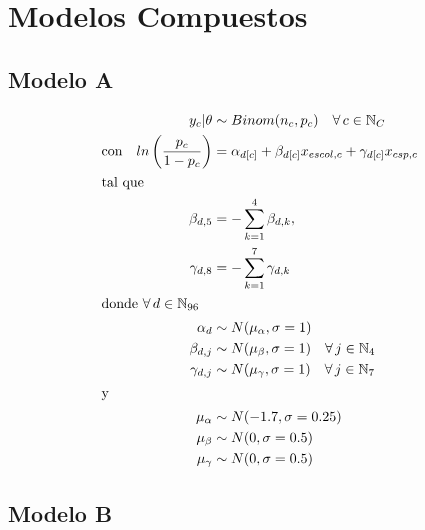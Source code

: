 \chapter{Modelos Compuestos}\label{Anexo_modelos_compuestos}

\section*{Modelo A}

\begin{align}\label{eq:Modelo_Comp_A_Anexo}
y_c|\theta & \sim Binom(n_c,p_c) \quad \forall \, c \in \mathbb{N}_C \nonumber \\
\text{con} \quad ln\left(\dfrac{p_c}{1-p_c}\right) &= \alpha_{d[c]} + \beta_{d[c]} x_{escol,c} + \gamma_{d[c]} x_{csp,c} \\ 
\intertext{tal que} 
\beta_{d,5} &= -\sum\limits_{k = 1}^{4} \beta_{d,k}, \nonumber \\
\gamma_{d,8} &= -\sum\limits_{k = 1}^{7} \gamma_{d,k} \nonumber \\
\intertext{donde $\forall \, d \in \mathbb{N}_{96}$}
\alpha_d & \sim N(\mu_{\alpha}, \sigma=1) \quad  \nonumber \\
\beta_{d,j} & \sim N(\mu_{\beta}, \sigma=1) \quad \forall \, j \in \mathbb{N}_{4} \nonumber \\
\gamma_{d,j} & \sim N(\mu_{\gamma}, \sigma=1) \quad \forall \, j \in \mathbb{N}_{7} \nonumber \\
\intertext{y}
\mu_{\alpha} &\sim N(-1.7,\sigma=0.25) \nonumber \\
\mu_{\beta} &\sim N(0,\sigma=0.5) \nonumber \\
\mu_{\gamma} &\sim N(0,\sigma=0.5) \nonumber
\end{align}

\section*{Modelo B}

